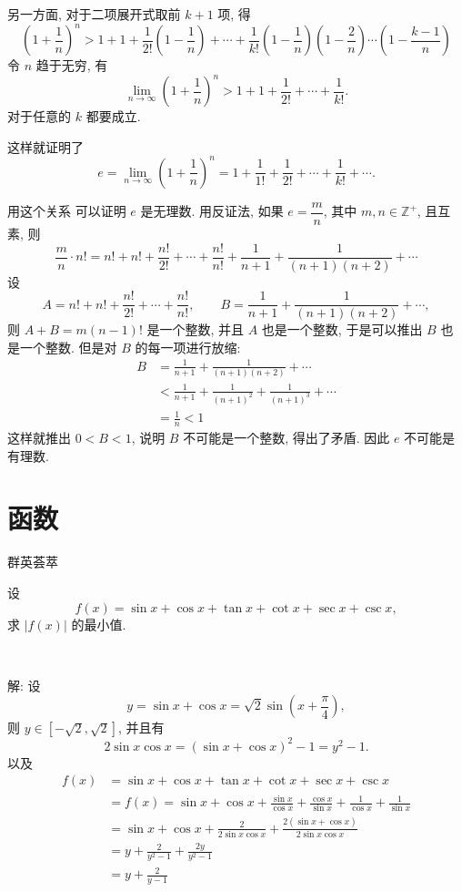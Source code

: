 另一方面, 对于二项展开式取前 $k+1$ 项, 得
\[\left(1+\frac{1}{n}\right)^n  > 1 + 1 + \frac{1}{2!}(1-\frac{1}{n}) + \cdots + \frac{1}{k!}(1-\frac{1}{n})(1-\frac{2}{n})\cdots(1-\frac{k-1}{n}) \]
令 $n$ 趋于无穷, 有
\[ \lim_{n\to\infty}\left(1+\frac{1}{n}\right)^n > 1 + 1 + \frac{1}{2!} + \cdots + \frac{1}{k!}. \]
对于任意的 $k$ 都要成立.

这样就证明了
\[e =  \lim_{n\to\infty}\left(1+\frac{1}{n}\right)^n = 1 + \frac{1}{1!} + \frac{1}{2!} + \cdots + \frac{1}{k!} + \cdots .\]

用这个关系 可以证明 $e$ 是无理数. 用反证法, 如果 $e = \dfrac{m}{n}$, 其中 $m,n\in\mathbb{Z}^+$, 且互素, 则
\[\frac{m}{n}\cdot n! = n! + n! + \frac{n!}{2!} + \cdots + \frac{n!}{n!} + \frac{1}{n+1} + \frac{1}{(n+1)(n+2)} + \cdots \]
设 
$$A = n!+n!+\dfrac{n!}{2!}+\cdots+\dfrac{n!}{n!}, \qquad B = \frac{1}{n+1} + \frac{1}{(n+1)(n+2)} + \cdots,$$ 
则 $A+B = m(n-1)!$ 是一个整数, 并且 $A$ 也是一个整数, 于是可以推出 $B$ 也是一个整数. 但是对 $B$ 的每一项进行放缩:
\begin{align*}
B &= \frac{1}{n+1} + \frac{1}{(n+1)(n+2)} + \cdots \\
& < \frac{1}{n+1} + \frac{1}{(n+1)^2} +  \frac{1}{(n+1)^3} + \cdots \\
&= \frac{1}{n} < 1
\end{align*}
这样就推出 $0 < B < 1$, 说明 $B$ 不可能是一个整数, 得出了矛盾. 因此 $e$ 不可能是有理数.

\newpage
\section{函数}
\noindent 群英荟萃

设 
\[f(x) = \sin x + \cos x + \tan x + \cot x + \sec x + \csc x ,\]
求 $ |f(x)| $ 的最小值.

~

解: 设 
\[ y = \sin x + \cos x = \sqrt{2}\sin(x+\frac{\pi}{4}), \]
则 $y\in[-\sqrt{2},\sqrt{2}]$, 并且有
\[2\sin x \cos x = (\sin x + \cos x)^2 - 1 = y^2 - 1 .\]
以及
\begin{align*}
f(x) &= \sin x + \cos x + \tan x + \cot x + \sec x + \csc x \\
&= f(x) = \sin x + \cos x + \frac{\sin x}{\cos x} + \frac{\cos x}{\sin x} + \frac{1}{\cos x} + \frac{1}{\sin x} \\
&= \sin x + \cos x + \frac{2}{2\sin x\cos x} + \frac{2(\sin x + \cos x)}{2\sin x\cos x}\\
&= y + \frac{2}{y^2 - 1} + \frac{2y}{y^2-1}\\
&= y+ \frac{2}{y-1}
\end{align*}


